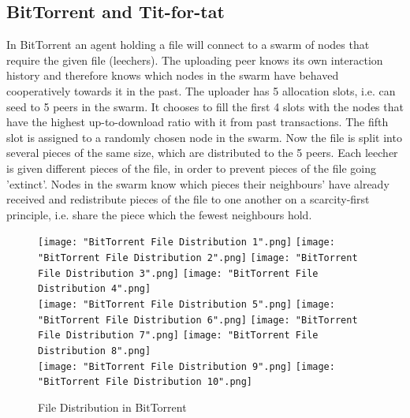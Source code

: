 \documentclass[11pt,a4paper]{article}
\theoremstyle{definition}
\theoremstyle{theorem}
\theoremstyle{proposition}
\theoremstyle{corollary}
\theoremstyle{lemma}
\theoremstyle{example}
\theoremstyle{remark}
\begin{document}
\subsection{BitTorrent and Tit-for-tat}
\label{subsec:BitTorrent and Tit-for-tat}
In BitTorrent an agent holding a file will connect to a swarm of nodes that require the given file (leechers). The uploading peer knows its own interaction history and therefore knows which nodes in the swarm have behaved cooperatively towards it in the past. The uploader has 5 allocation slots, i.e. can seed to 5 peers in the swarm. It chooses to fill the first 4 slots with the nodes that have the highest up-to-download ratio with it from past transactions. The fifth slot is assigned to a randomly chosen node in the swarm. Now the file is split into several pieces of the same size, which are distributed to the 5 peers. Each leecher is given different pieces of the file, in order to prevent pieces of the file going 'extinct'. Nodes in the swarm know which pieces their neighbours' have already received and redistribute pieces of the file to one another on a scarcity-first principle, i.e. share the piece which the fewest neighbours hold. \vspace{1em}\\

\begin{figure}%
\texttt{[image: "BitTorrent File Distribution 1".png]} \hspace{1em}
\texttt{[image: "BitTorrent File Distribution 2".png]} \hspace{1em}
\texttt{[image: "BitTorrent File Distribution 3".png]} \hspace{1em}
\texttt{[image: "BitTorrent File Distribution 4".png]} \vspace{2em} \\ %
\texttt{[image: "BitTorrent File Distribution 5".png]} \hspace{1em}
\texttt{[image: "BitTorrent File Distribution 6".png]} \hspace{1em}
\texttt{[image: "BitTorrent File Distribution 7".png]} \hspace{1em}
\texttt{[image: "BitTorrent File Distribution 8".png]} \vspace{2em} \\ %
\texttt{[image: "BitTorrent File Distribution 9".png]} \hspace{1em}
\texttt{[image: "BitTorrent File Distribution 10".png]}
\caption{File Distribution in BitTorrent}
\label{fig:File Distribution in BitTorrent}
\end{figure}
\end{document}
